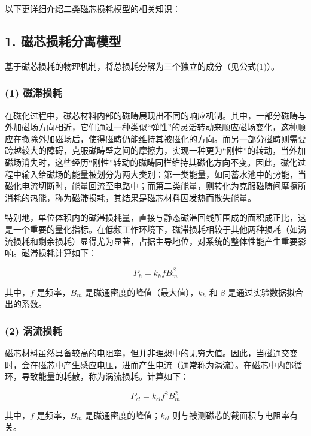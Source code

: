 \documentclass[a4paper,12pt]{ctexart}
\begin{document}
以下更详细介绍二类磁芯损耗模型的相关知识：

\subsection{1. 磁芯损耗分离模型}

基于磁芯损耗的物理机制，将总损耗分解为三个独立的成分（见公式(1)）。

\subsubsection{(1) 磁滞损耗}

在磁化过程中，磁芯材料内部的磁畴展现出不同的响应机制。其中，一部分磁畴与外加磁场方向相近，它们通过一种类似“弹性”的灵活转动来顺应磁场变化，这种顺应在撤除外加磁场后，使得磁畴仍能维持其被磁化的方向。而另一部分磁畴则需要跨越较大的障碍，克服磁畴壁之间的摩擦力，实现一种更为“刚性”的转动，当外加磁场消失时，这些经历“刚性”转动的磁畴同样维持其磁化方向不变。因此，磁化过程中输入给磁场的能量被划分为两大类别：第一类能量，如同蓄水池中的势能，当磁化电流切断时，能量回流至电路中；而第二类能量，则转化为克服磁畴间摩擦所消耗的热能，称为磁滞损耗，其结果是磁芯材料因发热而散失能量。

特别地，单位体积内的磁滞损耗量，直接与静态磁滞回线所围成的面积成正比，这是一个重要的量化指标。在低频工作环境下，磁滞损耗相较于其他两种损耗（如涡流损耗和剩余损耗）显得尤为显著，占据主导地位，对系统的整体性能产生重要影响。磁滞损耗计算如下：

\begin{equation}
P_h = k_h f B_m^\beta
\end{equation}

其中，$f$ 是频率，$B_m$ 是磁通密度的峰值（最大值），$k_h$ 和 $\beta$ 是通过实验数据拟合出的系数。

\subsubsection{(2) 涡流损耗}

磁芯材料虽然具备较高的电阻率，但并非理想中的无穷大值。因此，当磁通交变时，会在磁芯中产生感应电压，进而产生电流（通常称为涡流）。在磁芯中内部循环，导致能量的耗散，称为涡流损耗。计算如下：

\begin{equation}
P_{cl} = k_{cl} f^2 B_m^2
\end{equation}

其中，$f$ 是频率，$B_m$ 是磁通密度的峰值；$k_{cl}$ 则与被测磁芯的截面积与电阻率有关。
\end{document}
